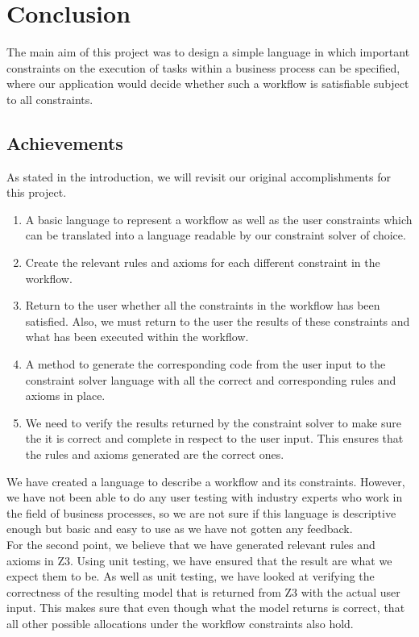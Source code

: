 \documentclass[a4paper]{report}
\begin{document}
\chapter{Conclusion}
The main aim of this project was to design a simple language in which important constraints on the execution of tasks within a business process can be specified, where our application would decide whether such a workflow is satisfiable subject to all constraints.

\section{Achievements}
As stated in the introduction, we will revisit our original accomplishments for this project.
\begin{enumerate}
\item A basic language to represent a workflow as well as the user constraints which can be translated into a language readable by our constraint solver of choice.
\item Create the relevant rules and axioms for each different constraint in the workflow.
\item Return to the user whether all the constraints in the workflow has been satisfied. Also, we must return to the user the results of these constraints and what has been executed within the workflow.
\item A method to generate the corresponding code from the user input to the constraint solver language with all the correct and corresponding rules and axioms in place. 
\item We need to verify the results returned by the constraint solver to make sure the it is correct and complete in respect to the user input. This ensures that the rules and axioms generated are the correct ones. 
\end{enumerate}

We have created a language to describe  a workflow and its constraints. However, we have not been able to do any user testing with industry experts who work in the field of business processes, so we are not sure if this language is descriptive enough but basic and easy to use as we have not gotten any feedback. \\

For the second point, we believe that we have generated relevant rules and axioms in Z3. Using unit testing, we have ensured that the result are what we expect them to be. As well as unit testing, we have looked at verifying the correctness of the resulting model that is returned from Z3 with the actual user input. This makes sure that even though what the model returns is correct, that all other possible allocations under the workflow constraints also hold. \\
\end{document}
